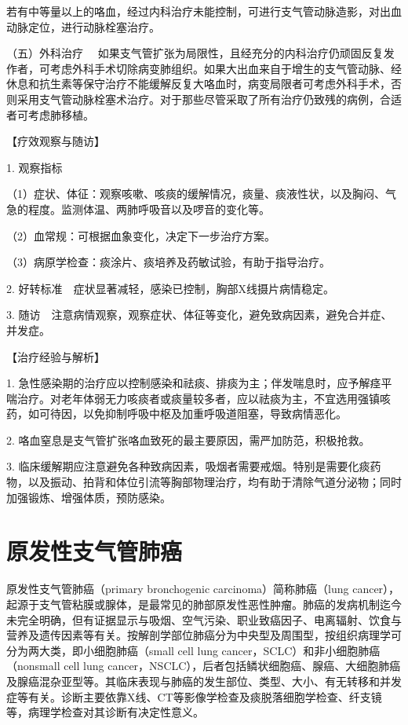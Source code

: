 若有中等量以上的咯血，经过内科治疗未能控制，可进行支气管动脉造影，对出血动脉定位，进行动脉栓塞治疗。

{（五）外科治疗}
　如果支气管扩张为局限性，且经充分的内科治疗仍顽固反复发作者，可考虑外科手术切除病变肺组织。如果大出血来自于增生的支气管动脉、经休息和抗生素等保守治疗不能缓解反复大咯血时，病变局限者可考虑外科手术，否则采用支气管动脉栓塞术治疗。对于那些尽管采取了所有治疗仍致残的病例，合适者可考虑肺移植。

【疗效观察与随访】

1. 观察指标

（1）症状、体征：观察咳嗽、咳痰的缓解情况，痰量、痰液性状，以及胸闷、气急的程度。监测体温、两肺呼吸音以及啰音的变化等。

（2）血常规：可根据血象变化，决定下一步治疗方案。

（3）病原学检查：痰涂片、痰培养及药敏试验，有助于指导治疗。

2. 好转标准　症状显著减轻，感染已控制，胸部X线摄片病情稳定。

3.
随访　注意病情观察，观察症状、体征等变化，避免致病因素，避免合并症、并发症。

【治疗经验与解析】

1.
急性感染期的治疗应以控制感染和祛痰、排痰为主；伴发喘息时，应予解痉平喘治疗。对老年体弱无力咳痰者或痰量较多者，应以祛痰为主，不宜选用强镇咳药，如可待因，以免抑制呼吸中枢及加重呼吸道阻塞，导致病情恶化。

2. 咯血窒息是支气管扩张咯血致死的最主要原因，需严加防范，积极抢救。

3.
临床缓解期应注意避免各种致病因素，吸烟者需要戒烟。特别是需要化痰药物，以及振动、拍背和体位引流等胸部物理治疗，均有助于清除气道分泌物；同时加强锻炼、增强体质，预防感染。

\section{原发性支气管肺癌}

原发性支气管肺癌（primary bronchogenic carcinoma）简称肺癌（lung
cancer），起源于支气管粘膜或腺体，是最常见的肺部原发性恶性肿瘤。肺癌的发病机制迄今未完全明确，但有证据显示与吸烟、空气污染、职业致癌因子、电离辐射、饮食与营养及遗传因素等有关。按解剖学部位肺癌分为中央型及周围型，按组织病理学可分为两大类，即小细胞肺癌（small
cell lung cancer，SCLC）和非小细胞肺癌（nonsmall cell lung
cancer，NSCLC），后者包括鳞状细胞癌、腺癌、大细胞肺癌及腺癌混杂亚型等。其临床表现与肺癌的发生部位、类型、大小、有无转移和并发症等有关。诊断主要依靠X线、CT等影像学检查及痰脱落细胞学检查、纤支镜等，病理学检查对其诊断有决定性意义。

